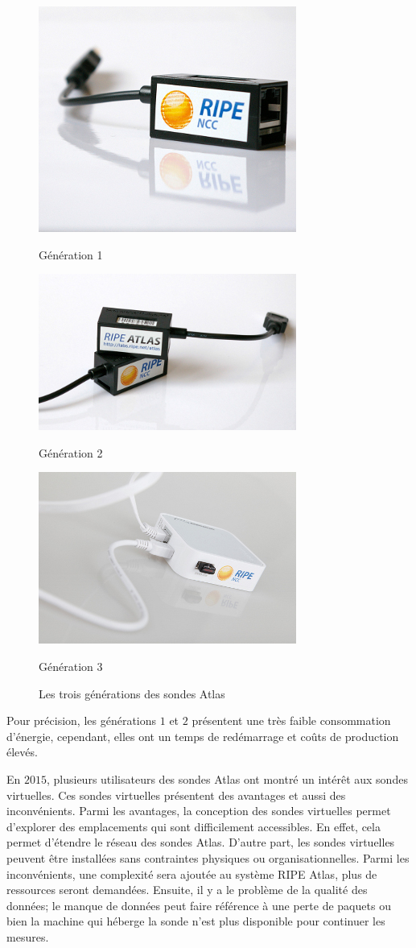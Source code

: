 \begin{figure}[H]
	
	\parbox{.32\textwidth}{\includegraphics[width=.30\textwidth, height=.20\textwidth]{illustrations/v1} 	\captionsetup{justification=centering}\caption{Génération 1}}
	\hfill
	\parbox{.32\textwidth}{\includegraphics[width=.30\textwidth, height=.20\textwidth]{illustrations/v2}
		\captionsetup{justification=centering}
		\caption{Génération 2}}
	\hfill
	\parbox{.32\textwidth}{\includegraphics[width=.30\textwidth,height=.20\textwidth]{illustrations/v3} 	\captionsetup{justification=centering}\caption{Génération 3}}
	\caption{Les trois générations des sondes Atlas}
	\label{fig:genarations}
\end{figure}

Pour précision, les générations $1$ et $2$ présentent une très faible consommation d'énergie, cependant, elles ont un temps de redémarrage et coûts de production élevés. 


En $2015$, plusieurs utilisateurs des sondes  Atlas ont montré un intérêt aux sondes virtuelles. Ces sondes virtuelles présentent des avantages et aussi des inconvénients. Parmi les avantages, la conception des sondes virtuelles permet d'explorer des emplacements qui sont difficilement accessibles. En effet, cela permet d'étendre le réseau des sondes  Atlas. D'autre part, les sondes virtuelles peuvent être installées sans contraintes physiques ou organisationnelles. Parmi les inconvénients, une complexité sera ajoutée au système RIPE Atlas, plus de ressources seront demandées. Ensuite, il y a le problème de la qualité des données; le manque de données peut faire référence à une perte de paquets ou bien la machine qui héberge la sonde n'est plus disponible pour continuer les mesures. 




